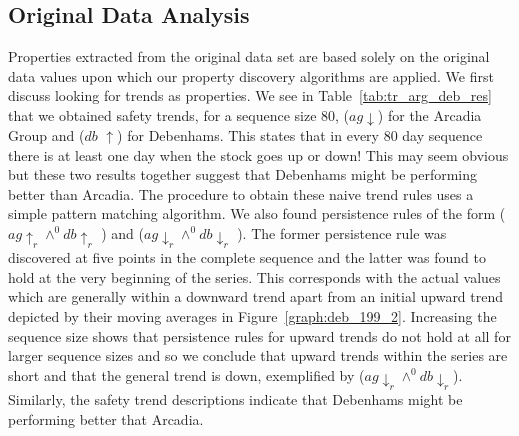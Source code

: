 {\begin{table}[ht]
\begin{center}
\end{center}
\caption{\label{tab:tr_arg_deb_res} Results for 199 days of Arcadia and
Debenhams Group }
\end{table}
}

\subsection{Original Data Analysis}\label{subsec:tr_analysis}

Properties extracted from the original data set are based solely on
the original data values upon which our property discovery algorithms
are applied. We first discuss looking for trends as properties. We see
in Table~\ref{tab:tr_arg_deb_res} that we obtained safety trends, for
a sequence 
size 80,  ($ag \downarrow$) for the Arcadia Group and 
($db$ $\uparrow$) for Debenhams. This states that in every 80 day sequence
there is at least one day when the stock goes up or down! This may seem
obvious but these two results together suggest that Debenhams might be
performing better than Arcadia. The procedure to obtain these naive trend
rules uses a simple pattern matching algorithm. We also found 
persistence rules of the form 
   ($ag \uparrow_r \wedge^{0} db \uparrow_r$ ) and  
($ag \downarrow_r \wedge^{0} db \downarrow_r$ ). The former
persistence rule was 
discovered at five points in the complete sequence and the latter was found to
hold at the very beginning of the series. This corresponds with the
actual values which are generally within a downward trend apart from
an initial upward trend depicted by their moving averages in Figure~\ref{graph:deb_199_2}. Increasing the sequence size shows that
persistence rules for upward trends do not hold at all for larger
sequence sizes and so we conclude that upward trends within the series
are short and that the general trend is down, exemplified by
 ($ag \downarrow_r \wedge^0 db \downarrow_r$). Similarly,
the safety 
trend descriptions indicate that Debenhams might be performing better
that Arcadia.
			

